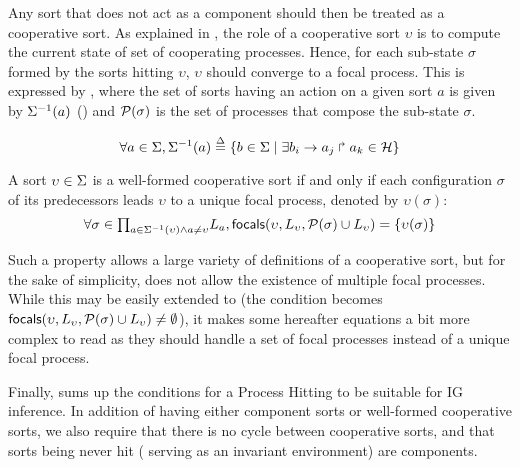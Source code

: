 Any sort that does not act as a component should then be treated as a cooperative sort.
As explained in , the role of a cooperative sort $\upsilon$ is to compute the current
state of set of cooperating processes.
Hence, for each sub-state $\sigma$ formed by the sorts hitting $\upsilon$, $\upsilon$ should
converge to a focal process.
This is expressed by , where
the set of sorts having an action on a given sort $a$ is given by 
$\Sigma^{-1}(a)$ ()
and $\mathcal{P}(\sigma)$ is the set of processes that compose the sub-state $\sigma$.

\begin{equation}
\forall a \in \Sigma, \Sigma^{-1}(a) \stackrel{\Delta}= \{b \in \Sigma \mid \exists b_i\rightarrow a_j\Rsh a_k\in\mathcal{H} \}
\label{eq:ph_direct_predec}
\end{equation}

\begin{property}\label{pro:wf-cooperative-sort}
A sort $\upsilon\in\Sigma$ is a well-formed cooperative sort if and only if
each configuration $\sigma$ of its predecessors leads $\upsilon$ to a unique focal process,
denoted by $\upsilon(\sigma)$:
\[
\forall \sigma \in {\textstyle\prod_{
a\in\Sigma^{-1}(\upsilon) \wedge a\neq \upsilon}}
L_{a},
\mathsf{focals}(\upsilon,L_\upsilon,\mathcal{P}(\sigma)\cup L_\upsilon) = \{ \upsilon(\sigma) \}\]
\end{property}

Such a property allows a large variety of definitions of a cooperative sort, but
for the sake of simplicity, does not allow the existence of multiple focal processes.
While this may be easily extended to (the condition becomes 
$\mathsf{focals}(\upsilon,L_\upsilon, \mathcal{P}(\sigma)\cup L_\upsilon)\neq\emptyset$), it makes some
hereafter equations a bit more complex to read as they should handle a set of focal processes instead
of a unique focal process.


Finally,  sums up the conditions for a Process Hitting to be suitable for IG
inference.
In addition of having either component sorts or well-formed cooperative sorts, we also require that
there is no cycle between cooperative sorts, and that
sorts being never hit (\ie{} serving as an invariant environment) are components.

